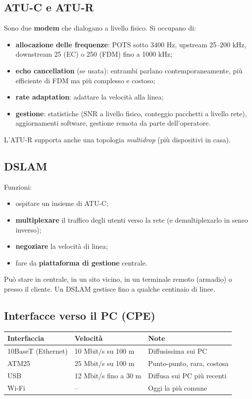 \subsection{ATU-C e ATU-R}

Sono due \textbf{modem} che dialogano a livello fisico. Si occupano di:

\begin{itemize}
\tightlist
\item
  \textbf{allocazione delle frequenze}: POTS sotto 3400 Hz, upstream 25--200 kHz, downstream 25 (EC) o 250 (FDM) fino a 1000 kHz;
\item
  \textbf{echo cancellation} (se usata): entrambi parlano contemporaneamente, più efficiente di FDM ma più complesso e costoso;
\item
  \textbf{rate adaptation}: adattare la velocità alla linea;
\item
  \textbf{gestione}: statistiche (SNR a livello fisico, conteggio pacchetti a livello rete), aggiornamenti software, gestione remota da parte dell'operatore.
\end{itemize}

L'ATU-R supporta anche una topologia \emph{multidrop} (più dispositivi in casa).

\subsection{DSLAM}

Funzioni:

\begin{itemize}
\tightlist
\item
  ospitare un insieme di ATU-C;
\item
  \textbf{multiplexare} il traffico degli utenti verso la rete (e demultiplexarlo in senso inverso);
\item
  \textbf{negoziare} la velocità di linea;
\item
  fare da \textbf{piattaforma di gestione} centrale.
\end{itemize}

Può stare in centrale, in un sito vicino, in un terminale remoto (armadio) o presso il cliente. Un DSLAM gestisce fino a qualche centinaio di linee.

\subsection{Interfacce verso il PC (CPE)}

\begin{longtable}[]{@{}lll@{}}
\toprule\noalign{}
Interfaccia & Velocità & Note \\
\midrule\noalign{}
\endhead
\bottomrule\noalign{}
\endlastfoot
10BaseT (Ethernet) & 10 Mbit/s su 100 m & Diffusissima sui PC \\
ATM25 & 25 Mbit/s su 100 m & Punto-punto, rara, costosa \\
USB & 12 Mbit/s fino a 30 m & Diffusa sui PC più recenti \\
Wi-Fi & -- & Oggi la più comune \\
\end{longtable}

